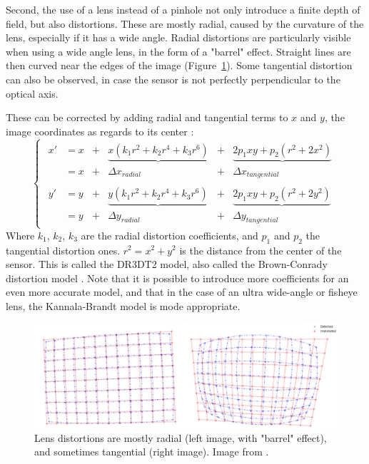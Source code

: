 \vspace*{0.5cm}
Second, the use of a lens instead of a pinhole not only introduce a finite depth of field, but also distortions. These are mostly radial, caused by the curvature of the lens, especially if it has a wide angle. Radial distortions are particularly visible when using a wide angle lens, in the form of a "barrel" effect. Straight lines are then curved near the edges of the image (Figure~\ref{fig_distortions}). Some tangential distortion can also be observed, in case the sensor is not perfectly perpendicular to the optical axis. 

These can be corrected by adding radial and tangential terms to $x$ and $y$, the image coordinates as regards to its center \cite{Weng1992}:
\begin{equation}
  \begin{cases}
  \begin{array}{rlcccc}
    x' &= x &+ &\underbrace{x(k_1 r^2 + k_2 r^4 + k_3 r^6)} &+ &\underbrace{2 p_1 x y + p_2(r^2 + 2 x^2)}\\
    &= x &+ &\Delta x_{radial} &+ &\Delta x_{tangential}\\
    \\
    y' &= y &+ &\underbrace{y(k_1 r^2 + k_2 r^4 + k_3 r^6)} &+ &\underbrace{2 p_1 x y + p_2(r^2 + 2 y^2)}\\
    &= y &+ &\Delta y_{radial} &+ &\Delta y_{tangential}
    \end{array}
  \end{cases}
\end{equation}
Where $k_1$, $k_2$, $k_3$ are the radial distortion coefficients, and $p_1$ and $p_2$ the tangential distortion ones. $r^2 = x^2 + y^2$ is the distance from the center of the sensor. This is called the DR3DT2 model, also called the Brown-Conrady distortion model \cite{Conrady1919,Brown1966}. Note that it is possible to introduce more coefficients for an even more accurate model, and that in the case of an ultra wide-angle or fisheye lens, the Kannala-Brandt model \cite{Kannala2006} is mode appropriate.

\begin{figure}[hbtp]
	\centering
	\def\svgwidth{\columnwidth}
	\fontsize{10pt}{10pt}\selectfont
	\includegraphics[width=\linewidth]{"../Chap2/Figures/Distortions.png"}
	\caption{Lens distortions are mostly radial (left image, with "barrel" effect), and sometimes tangential (right image). Image from \cite{Ricolfe2010}.} 
	\label{fig_distortions}
\end{figure}


